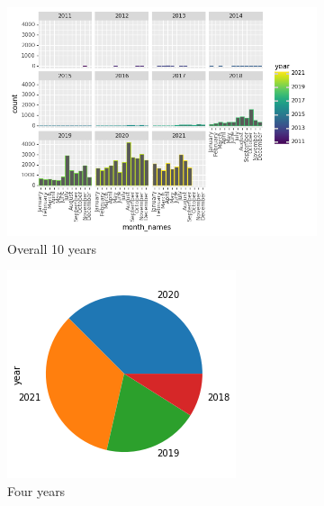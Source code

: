 \begin{figure}
      \centering
	    \begin{subfigure}{0.2\linewidth}
		\includegraphics[width=\linewidth]{postgrad_template 2/chapters/chapter1/Overall 10 years of data.png}
		\caption{Overall 10 years}
		\label{fig: 10 year data distribution}
	   \end{subfigure}
	   \begin{subfigure}{0.1\linewidth}
		\includegraphics[width=\linewidth]{postgrad_template 2/chapters/chapter1/Annual trends Second Data.png}
		\caption{Four years}
		\label{fig:Four years}
	    \end{subfigure}
	   \vfill
	 \caption{}
\end{figure}

